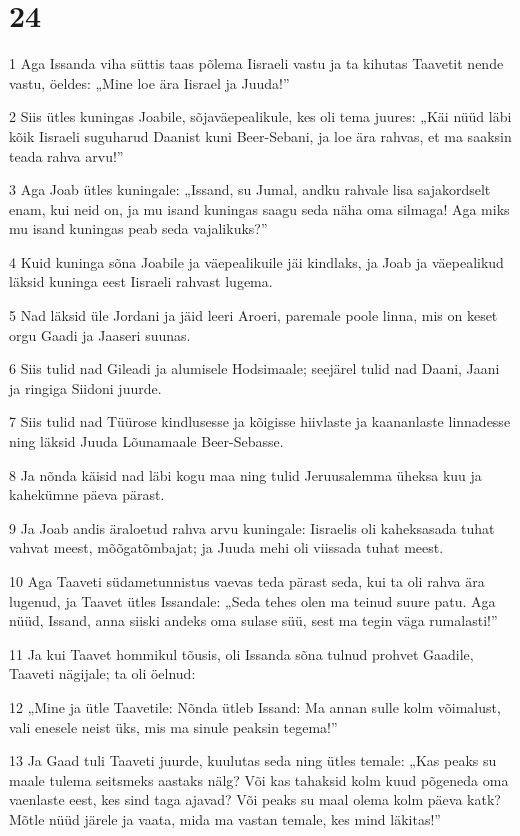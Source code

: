 \chapter{24}

\par 1 Aga Issanda viha süttis taas põlema Iisraeli vastu ja ta kihutas Taavetit nende vastu, öeldes: „Mine loe ära Iisrael ja Juuda!”
\par 2 Siis ütles kuningas Joabile, sõjaväepealikule, kes oli tema juures: „Käi nüüd läbi kõik Iisraeli suguharud Daanist kuni Beer-Sebani, ja loe ära rahvas, et ma saaksin teada rahva arvu!”
\par 3 Aga Joab ütles kuningale: „Issand, su Jumal, andku rahvale lisa sajakordselt enam, kui neid on, ja mu isand kuningas saagu seda näha oma silmaga! Aga miks mu isand kuningas peab seda vajalikuks?”
\par 4 Kuid kuninga sõna Joabile ja väepealikuile jäi kindlaks, ja Joab ja väepealikud läksid kuninga eest Iisraeli rahvast lugema.
\par 5 Nad läksid üle Jordani ja jäid leeri Aroeri, paremale poole linna, mis on keset orgu Gaadi ja Jaaseri suunas.
\par 6 Siis tulid nad Gileadi ja alumisele Hodsimaale; seejärel tulid nad Daani, Jaani ja ringiga Siidoni juurde.
\par 7 Siis tulid nad Tüürose kindlusesse ja kõigisse hiivlaste ja kaananlaste linnadesse ning läksid Juuda Lõunamaale Beer-Sebasse.
\par 8 Ja nõnda käisid nad läbi kogu maa ning tulid Jeruusalemma üheksa kuu ja kahekümne päeva pärast.
\par 9 Ja Joab andis äraloetud rahva arvu kuningale: Iisraelis oli kaheksasada tuhat vahvat meest, mõõgatõmbajat; ja Juuda mehi oli viissada tuhat meest.
\par 10 Aga Taaveti südametunnistus vaevas teda pärast seda, kui ta oli rahva ära lugenud, ja Taavet ütles Issandale: „Seda tehes olen ma teinud suure patu. Aga nüüd, Issand, anna siiski andeks oma sulase süü, sest ma tegin väga rumalasti!”
\par 11 Ja kui Taavet hommikul tõusis, oli Issanda sõna tulnud prohvet Gaadile, Taaveti nägijale; ta oli öelnud:
\par 12 „Mine ja ütle Taavetile: Nõnda ütleb Issand: Ma annan sulle kolm võimalust, vali enesele neist üks, mis ma sinule peaksin tegema!”
\par 13 Ja Gaad tuli Taaveti juurde, kuulutas seda ning ütles temale: „Kas peaks su maale tulema seitsmeks aastaks nälg? Või kas tahaksid kolm kuud põgeneda oma vaenlaste eest, kes sind taga ajavad? Või peaks su maal olema kolm päeva katk? Mõtle nüüd järele ja vaata, mida ma vastan temale, kes mind läkitas!”
